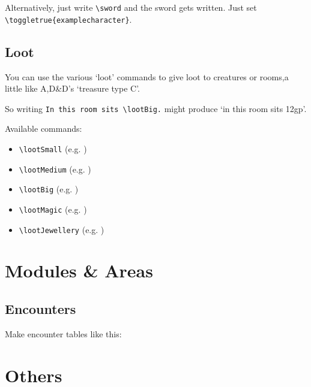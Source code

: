 \documentclass[a4paper,openany]{book}
\begin{document}
\begin{multicols}{2}
Alternatively, just write \verb"\sword" and the sword gets written.
Just set \verb"\toggletrue{examplecharacter}".

\subsection{Loot}

You can use the various `loot' commands to give loot to creatures or rooms,a little like A,D\&D's `treasure type C'.

So writing \verb"In this room sits \lootBig." might produce `in this room sits 12gp'.

Available commands:

\begin{itemize}

  \item
  \verb"\lootSmall" (e.g. \lootSmall)
  \item
  \verb"\lootMedium" (e.g. \lootMedium)
  \item
  \verb"\lootBig" (e.g. \lootBig)
  \item
  \verb"\lootMagic" (e.g. \lootMagic)
  \item
  \verb"\lootJewellery" (e.g. \lootJewellery)

\end{itemize}

\end{multicols}

\section{Modules \& Areas}

\subsection{Encounters}

Make encounter tables like this:

\section{Others}
\end{document}
